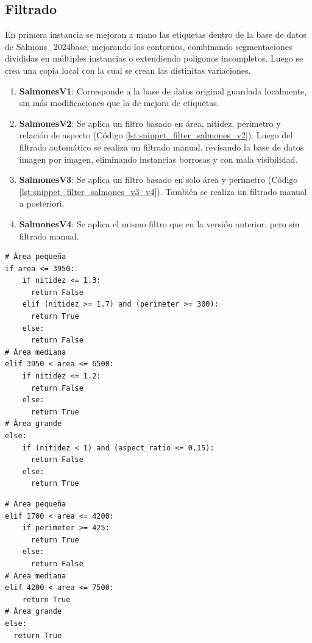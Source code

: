 \subsection{Filtrado}
En primera instancia se mejoran a mano las etiquetas dentro de la base de datos de Salmons_2024base, mejorando los contornos, combinando segmentaciones divididas en múltiples instancias o extendiendo poligonos incompletos. Luego se crea una copia local con la cual se crean las distinitas variaciones.
\begin{enumerate}%
  \setlength{\itemsep}{0pt}%
  \setlength{\parskip}{0pt}%
  \setlength{\parsep}{0pt}%
  \item \textbf{SalmonesV1}: Corresponde a la base de datos original guardada localmente, sin más modificaciones que la de mejora de etiquetas.
  \item \textbf{SalmonesV2}: Se aplica un filtro basado en área, nitidez, perímetro y relación de aspecto (Código \ref{lst:snippet_filter_salmones_v2}). Luego del filtrado automático se realiza un filtrado manual, revisando la base de datos imagen por imagen, eliminando instancias borrosas y con mala visibilidad.
  \item \textbf{SalmonesV3}: Se aplica un filtro basado en solo área y perímetro (Código \ref{lst:snippet_filter_salmones_v3_v4}). También se realiza un filtrado manual a posteriori.
  \item \textbf{SalmonesV4}: Se aplica el mismo filtro que en la versión anterior, pero sin filtrado manual.
\end{enumerate}

\begin{listing}[htbp]
\caption[Criterio de filtrado usado en SalmonesV2]{\textit{Snippet} con el criterio de filtrado utilizado en la versión SalmonesV2.}
\label{lst:snippet_filter_salmones_v2}
\begin{verbatim}
# Área pequeña
if area <= 3950:
    if nitidez <= 1.3:
      return False
    elif (nitidez >= 1.7) and (perimeter >= 300):
      return True
    else:
      return False
# Área mediana
elif 3950 < area <= 6500:   
    if nitidez <= 1.2:
      return False
    else:
      return True
# Área grande
else:
    if (nitidez < 1) and (aspect_ratio <= 0.15):
      return False
    else:
      return True
\end{verbatim}
\end{listing}

\begin{listing}[htbp]
\caption[Criterio de filtrado usado en SalmonesV3 y SalmonesV4]{\textit{Snippet} con el criterio de filtrado utilizado en las versiones SalmonesV3 y SalmonesV4.} 
\label{lst:snippet_filter_salmones_v3_v4}
\begin{verbatim}
# Área pequeña
elif 1700 < area <= 4200:
    if perimeter >= 425:
      return True
    else:
      return False
# Área mediana
elif 4200 < area <= 7500:
    return True
# Área grande
else:
  return True
\end{verbatim}
\end{listing}

